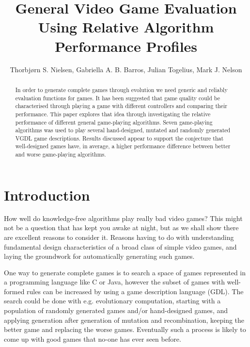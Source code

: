 \documentclass{llncs}
\title{General Video Game Evaluation Using Relative Algorithm Performance Profiles}
\author{
Thorbjørn S. Nielsen, Gabriella A. B. Barros, Julian Togelius, Mark J. Nelson\\
}
\institute{
Center for Computer Games Research, IT University of Copenhagen, Denmark
}
\begin{document}
\maketitle

\begin{abstract}
In order to generate complete games through evolution we need generic and reliably evaluation functions for games. It has been suggested that game quality could be characterised through playing a game with different controllers and comparing their performance. This paper explores that idea through investigating the relative performance of different general game-playing algorithms. Seven game-playing algorithms was used to play several hand-designed, mutated and randomly generated VGDL game descriptions. Results discussed appear to support the conjecture that well-designed games have, in average, a higher performance difference between better and worse game-playing algorithms.
\end{abstract}


\section{Introduction}
How well do knowledge-free algorithms play really bad video games? This might not be a question that has kept you awake at night, but as we shall show there are excellent reasons to consider it. Reasons having to do with understanding fundamental design characteristics of a broad class of simple video games, and laying the groundwork for automatically generating such games.

One way to generate complete games is to search a space of games represented in a programming language like C or Java, however the subset of games with well-formed rules can be increased by using a game description language (GDL). The search could be done with e.g. evolutionary computation, starting with a population of randomly generated games and/or hand-designed games, and applying generation after generation of mutation and recombination, keeping the better game and replacing the worse games. Eventually such a process is likely to come up with good games that no-one has ever seen before.
\end{document}
